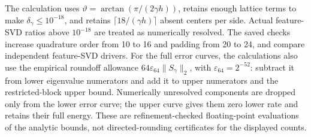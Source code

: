 The calculation uses $\vartheta=\arctan(\pi/(2\gamma h))$,
retains enough lattice terms to make $\delta_\gamma\le10^{-18}$,
and retains $\lceil18/(\gamma h)\rceil$ absent centers per side.
Actual feature-SVD ratios above $10^{-18}$ are treated as numerically resolved.
The saved checks increase quadrature order from 10 to 16 and padding
from 20 to 24, and compare independent feature-SVD drivers.
For the full error curves, the calculations also use the empirical
roundoff allowance $64\varepsilon_{64}\|S_\gamma\|_2$, with
$\varepsilon_{64}=2^{-52}$: subtract it from lower eigenvalue numerators
and add it to upper numerators and the restricted-block upper bound.
Numerically unresolved components are dropped only from the lower error
curve; the upper curve gives them zero lower rate and retains their full energy.
These are refinement-checked floating-point evaluations of the analytic
bounds, not directed-rounding certificates for the displayed counts.
